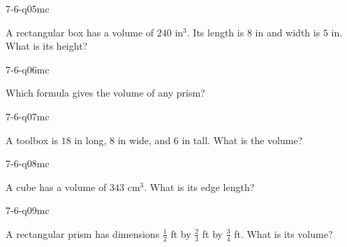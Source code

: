 \begin{practiceQuestion}{7-6-q05}{mc}
\begin{questionText}
A rectangular box has a volume of $240$ in$^3$. Its length is $8$ in and width is $5$ in. What is its height?
\end{questionText}
\end{practiceQuestion}

\begin{practiceQuestion}{7-6-q06}{mc}
\begin{questionText}
Which formula gives the volume of any prism?
\end{questionText}
\end{practiceQuestion}

\begin{practiceQuestion}{7-6-q07}{mc}
\begin{questionText}
A toolbox is $18$ in long, $8$ in wide, and $6$ in tall. What is the volume?
\end{questionText}
\end{practiceQuestion}

\begin{practiceQuestion}{7-6-q08}{mc}
\begin{questionText}
A cube has a volume of $343$ cm$^3$. What is its edge length?
\end{questionText}
\end{practiceQuestion}

\begin{practiceQuestion}{7-6-q09}{mc}
\begin{questionText}
A rectangular prism has dimensions $\frac{1}{2}$ ft by $\frac{2}{3}$ ft by $\frac{3}{4}$ ft. What is its volume?
\end{questionText}
\end{practiceQuestion}

